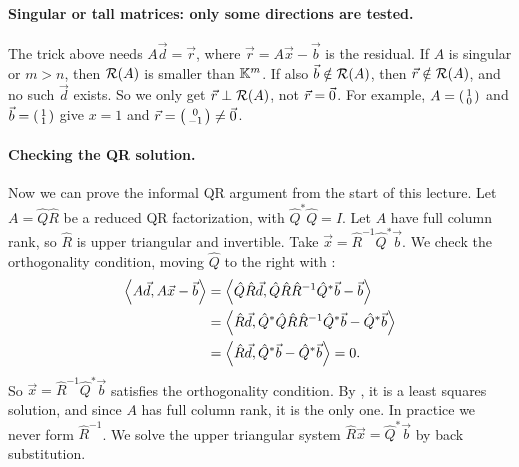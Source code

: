 \paragraph{Singular or tall matrices: only some directions are tested.} The trick above needs $A\vec{d} = \vec{r}$, where $\vec{r} = A\vec{x} - \vec{b}$ is the residual. If $A$ is singular or $m > n$, then $\mathcal{R}(A)$ is smaller than $\mathbb{K}^m$. If also $\vec{b} \notin \mathcal{R}(A)$, then $\vec{r} \notin \mathcal{R}(A)$, and no such $\vec{d}$ exists. So we only get $\vec{r} \perp \mathcal{R}(A)$, not $\vec{r} = \vec{0}$. For example, $A = \begin{psmallmatrix} 1 \\ 0 \end{psmallmatrix}$ and $\vec{b} = \begin{psmallmatrix} 1 \\ 1 \end{psmallmatrix}$ give $x = 1$ and $\vec{r} = \begin{psmallmatrix} 0 \\ -1 \end{psmallmatrix} \ne \vec{0}$.

\paragraph{Checking the QR solution.}\label{sec:verify-qr} Now we can prove the informal QR argument from the start of this lecture. Let $A = \hat{Q}\hat{R}$ be a reduced QR factorization, with $\hat{Q}^\ast\hat{Q} = I$. Let $A$ have full column rank, so $\hat{R}$ is upper triangular and invertible. Take $\vec{x} = \hat{R}^{-1}\hat{Q}^\ast\vec{b}$. We check the orthogonality condition, moving $\hat{Q}$ to the right with :
\begin{equation}
  \begin{aligned}
    \left\langle A\vec{d}, A\vec{x} - \vec{b} \right\rangle &= \left\langle \hat{Q}\hat{R}\vec{d}, \hat{Q}\hat{R}\hat{R}^{-1}\hat{Q}^\ast\vec{b} - \vec{b} \right\rangle \\
    &= \left\langle \hat{R}\vec{d}, \hat{Q}^\ast\hat{Q}\hat{R}\hat{R}^{-1}\hat{Q}^\ast\vec{b} - \hat{Q}^\ast\vec{b} \right\rangle \\
    &= \left\langle \hat{R}\vec{d}, \hat{Q}^\ast\vec{b} - \hat{Q}^\ast\vec{b} \right\rangle = 0.
  \end{aligned}
\end{equation}
So $\vec{x} = \hat{R}^{-1}\hat{Q}^\ast\vec{b}$ satisfies the orthogonality condition. By , it is a least squares solution, and since $A$ has full column rank, it is the only one. In practice we never form $\hat{R}^{-1}$. We solve the upper triangular system $\hat{R}\vec{x} = \hat{Q}^\ast\vec{b}$ by back substitution.

